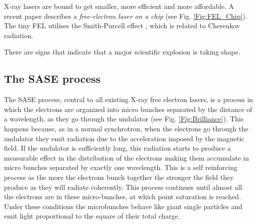 X-ray lasers are bound to get smaller, more efficient and more affordable. A
recent paper describes a {\em free-electron laser on a chip}
(see Fig. \ref{Fig:FEL_Chip}). The tiny FEL utilises the Smith-Purcell effect
\cite{Smith1953Visible}, which is related to Cherenkov radiation.
  
There are signs that indicate that a major scientific explosion is taking shape.
 



\subsection{The SASE process}

The SASE process, central to all existing X-ray free electron lasers, is a
process in which the electrons are organized into micro bunches separated by the
distance of a wavelength, as they go through the undulator (see
Fig. \ref{Fig:Brilliance}). This happens because,
as in a normal synchrotron, when the electrons go through the undulator they
emit radiation due to the acceleration imposed by the magnetic field. If
the undulator is sufficiently long, this radiation starts to produce a
measurable effect in the distribution of the electrons making them accumulate in
micro bunches separated by exactly one wavelength. This is a self reinforcing
process as the more the electrons bunch together the stronger the field they
produce as they will radiate coherently. This process continues until almost all
the electrons are in these micro-bunches, at which point saturation is
reached. Under these conditions the microbunches behave like giant 
single particles and emit light proportional to the square of their total charge.

